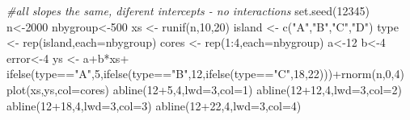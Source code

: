 \documentclass[
]{book}
\newenvironment{Shaded}{\begin{snugshade}}{\end{snugshade}}
\newcommand{\AttributeTok}[1]{\textcolor[rgb]{0.77,0.63,0.00}{#1}}
\newcommand{\CommentTok}[1]{\textcolor[rgb]{0.56,0.35,0.01}{\textit{#1}}}
\newcommand{\DecValTok}[1]{\textcolor[rgb]{0.00,0.00,0.81}{#1}}
\newcommand{\FunctionTok}[1]{\textcolor[rgb]{0.00,0.00,0.00}{#1}}
\newcommand{\NormalTok}[1]{#1}
\newcommand{\OtherTok}[1]{\textcolor[rgb]{0.56,0.35,0.01}{#1}}
\newcommand{\SpecialCharTok}[1]{\textcolor[rgb]{0.00,0.00,0.00}{#1}}
\newcommand{\StringTok}[1]{\textcolor[rgb]{0.31,0.60,0.02}{#1}}
\begin{document}
\begin{Shaded}
\begin{Highlighting}[]
\CommentTok{\#all slopes the same, diferent intercepts {-} no interactions}
\FunctionTok{set.seed}\NormalTok{(}\DecValTok{12345}\NormalTok{)}
\NormalTok{n}\OtherTok{\textless{}{-}}\DecValTok{2000}
\NormalTok{nbygroup}\OtherTok{\textless{}{-}}\DecValTok{500}
\NormalTok{xs }\OtherTok{\textless{}{-}} \FunctionTok{runif}\NormalTok{(n,}\DecValTok{10}\NormalTok{,}\DecValTok{20}\NormalTok{)}
\NormalTok{island }\OtherTok{\textless{}{-}} \FunctionTok{c}\NormalTok{(}\StringTok{"A"}\NormalTok{,}\StringTok{"B"}\NormalTok{,}\StringTok{"C"}\NormalTok{,}\StringTok{"D"}\NormalTok{)}
\NormalTok{type }\OtherTok{\textless{}{-}} \FunctionTok{rep}\NormalTok{(island,}\AttributeTok{each=}\NormalTok{nbygroup)}
\NormalTok{cores }\OtherTok{\textless{}{-}} \FunctionTok{rep}\NormalTok{(}\DecValTok{1}\SpecialCharTok{:}\DecValTok{4}\NormalTok{,}\AttributeTok{each=}\NormalTok{nbygroup)}
\NormalTok{a}\OtherTok{\textless{}{-}}\DecValTok{12}
\NormalTok{b}\OtherTok{\textless{}{-}}\DecValTok{4}
\NormalTok{error}\OtherTok{\textless{}{-}}\DecValTok{4}
\NormalTok{ys }\OtherTok{\textless{}{-}}\NormalTok{ a}\SpecialCharTok{+}\NormalTok{b}\SpecialCharTok{*}\NormalTok{xs}\SpecialCharTok{+}
\FunctionTok{ifelse}\NormalTok{(type}\SpecialCharTok{==}\StringTok{"A"}\NormalTok{,}\DecValTok{5}\NormalTok{,}\FunctionTok{ifelse}\NormalTok{(type}\SpecialCharTok{==}\StringTok{"B"}\NormalTok{,}\DecValTok{12}\NormalTok{,}\FunctionTok{ifelse}\NormalTok{(type}\SpecialCharTok{==}\StringTok{"C"}\NormalTok{,}\DecValTok{18}\NormalTok{,}\DecValTok{22}\NormalTok{)))}\SpecialCharTok{+}\FunctionTok{rnorm}\NormalTok{(n,}\DecValTok{0}\NormalTok{,}\DecValTok{4}\NormalTok{)}
\FunctionTok{plot}\NormalTok{(xs,ys,}\AttributeTok{col=}\NormalTok{cores)}
\FunctionTok{abline}\NormalTok{(}\DecValTok{12}\SpecialCharTok{+}\DecValTok{5}\NormalTok{,}\DecValTok{4}\NormalTok{,}\AttributeTok{lwd=}\DecValTok{3}\NormalTok{,}\AttributeTok{col=}\DecValTok{1}\NormalTok{)}
\FunctionTok{abline}\NormalTok{(}\DecValTok{12}\SpecialCharTok{+}\DecValTok{12}\NormalTok{,}\DecValTok{4}\NormalTok{,}\AttributeTok{lwd=}\DecValTok{3}\NormalTok{,}\AttributeTok{col=}\DecValTok{2}\NormalTok{)}
\FunctionTok{abline}\NormalTok{(}\DecValTok{12}\SpecialCharTok{+}\DecValTok{18}\NormalTok{,}\DecValTok{4}\NormalTok{,}\AttributeTok{lwd=}\DecValTok{3}\NormalTok{,}\AttributeTok{col=}\DecValTok{3}\NormalTok{)}
\FunctionTok{abline}\NormalTok{(}\DecValTok{12}\SpecialCharTok{+}\DecValTok{22}\NormalTok{,}\DecValTok{4}\NormalTok{,}\AttributeTok{lwd=}\DecValTok{3}\NormalTok{,}\AttributeTok{col=}\DecValTok{4}\NormalTok{)}
\end{Highlighting}
\end{Shaded}
\end{document}
